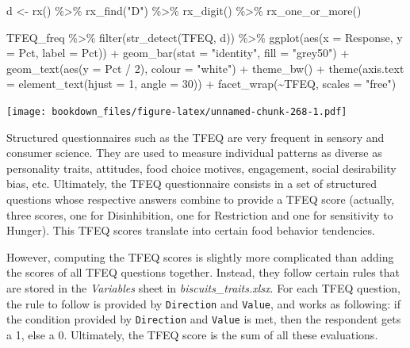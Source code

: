 \documentclass[
]{krantz}
\makeatletter
\newenvironment{Shaded}{\begin{snugshade}}{\end{snugshade}}
\newcommand{\AttributeTok}[1]{\textcolor[rgb]{0.61,0.61,0.61}{#1}}
\newcommand{\DecValTok}[1]{\textcolor[rgb]{0.06,0.06,0.06}{#1}}
\newcommand{\FunctionTok}[1]{\textcolor[rgb]{0,0,0}{#1}}
\newcommand{\NormalTok}[1]{#1}
\newcommand{\OtherTok}[1]{\textcolor[rgb]{0.37,0.37,0.37}{#1}}
\newcommand{\SpecialCharTok}[1]{\textcolor[rgb]{0,0,0}{#1}}
\newcommand{\StringTok}[1]{\textcolor[rgb]{0.5,0.5,0.5}{#1}}
\newenvironment{kframe}{%
\medskip{}
\setlength{\fboxsep}{.8em}
 \def\at@end@of@kframe{}%
 \ifinner\ifhmode%
  \def\at@end@of@kframe{\end{minipage}}%
  \begin{minipage}{\columnwidth}%
 \fi\fi%
 \def\FrameCommand##1{\hskip\@totalleftmargin \hskip-\fboxsep
 \colorbox{shadecolor}{##1}\hskip-\fboxsep
     \hskip-\linewidth \hskip-\@totalleftmargin \hskip\columnwidth}%
 \MakeFramed {\advance\hsize-\width
   \@totalleftmargin\z@ \linewidth\hsize
   \@setminipage}}%
 {\par\unskip\endMakeFramed%
 \at@end@of@kframe}
\renewenvironment{Shaded}{\begin{kframe}}{\end{kframe}}
\makeatother
\begin{document}
\begin{Shaded}
\begin{Highlighting}[]
\NormalTok{d }\OtherTok{\textless{}{-}} \FunctionTok{rx}\NormalTok{() }\SpecialCharTok{\%\textgreater{}\%}
  \FunctionTok{rx\_find}\NormalTok{(}\StringTok{"D"}\NormalTok{) }\SpecialCharTok{\%\textgreater{}\%}
  \FunctionTok{rx\_digit}\NormalTok{() }\SpecialCharTok{\%\textgreater{}\%}
  \FunctionTok{rx\_one\_or\_more}\NormalTok{()}

\NormalTok{TFEQ\_freq }\SpecialCharTok{\%\textgreater{}\%}
  \FunctionTok{filter}\NormalTok{(}\FunctionTok{str\_detect}\NormalTok{(TFEQ, d)) }\SpecialCharTok{\%\textgreater{}\%}
  \FunctionTok{ggplot}\NormalTok{(}\FunctionTok{aes}\NormalTok{(}\AttributeTok{x =}\NormalTok{ Response, }\AttributeTok{y =}\NormalTok{ Pct, }\AttributeTok{label =}\NormalTok{ Pct)) }\SpecialCharTok{+}
  \FunctionTok{geom\_bar}\NormalTok{(}\AttributeTok{stat =} \StringTok{"identity"}\NormalTok{, }\AttributeTok{fill =} \StringTok{"grey50"}\NormalTok{) }\SpecialCharTok{+}
  \FunctionTok{geom\_text}\NormalTok{(}\FunctionTok{aes}\NormalTok{(}\AttributeTok{y =}\NormalTok{ Pct }\SpecialCharTok{/} \DecValTok{2}\NormalTok{), }\AttributeTok{colour =} \StringTok{"white"}\NormalTok{) }\SpecialCharTok{+}
  \FunctionTok{theme\_bw}\NormalTok{() }\SpecialCharTok{+}
  \FunctionTok{theme}\NormalTok{(}\AttributeTok{axis.text =} \FunctionTok{element\_text}\NormalTok{(}\AttributeTok{hjust =} \DecValTok{1}\NormalTok{, }\AttributeTok{angle =} \DecValTok{30}\NormalTok{)) }\SpecialCharTok{+}
  \FunctionTok{facet\_wrap}\NormalTok{(}\SpecialCharTok{\textasciitilde{}}\NormalTok{TFEQ, }\AttributeTok{scales =} \StringTok{"free"}\NormalTok{)}
\end{Highlighting}
\end{Shaded}

\texttt{[image: bookdown\_files/figure-latex/unnamed-chunk-268-1.pdf]}

Structured questionnaires such as the TFEQ are very frequent in sensory and consumer science. They are used to measure individual patterns as diverse as personality traits, attitudes, food choice motives, engagement, social desirability bias, etc. Ultimately, the TFEQ questionnaire consists in a set of structured questions whose respective answers combine to provide a TFEQ score (actually, three scores, one for Disinhibition, one for Restriction and one for sensitivity to Hunger). This TFEQ scores translate into certain food behavior tendencies.

However, computing the TFEQ scores is slightly more complicated than adding the scores of all TFEQ questions together. Instead, they follow certain rules that are stored in the \emph{Variables} sheet in \emph{biscuits\_traits.xlsx}. For each TFEQ question, the rule to follow is provided by \texttt{Direction} and \texttt{Value}, and works as following: if the condition provided by \texttt{Direction} and \texttt{Value} is met, then the respondent gets a 1, else a 0. Ultimately, the TFEQ score is the sum of all these evaluations.
\end{document}

